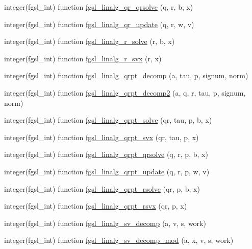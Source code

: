\begin{DoxyCompactItemize}
\item 
integer(fgsl\-\_\-int) function \hyperlink{linalg_8finc_a36ef785b86019f22ea32594b5f8060af}{fgsl\-\_\-linalg\-\_\-qr\-\_\-qrsolve} (q, r, b, x)
\item 
integer(fgsl\-\_\-int) function \hyperlink{linalg_8finc_a50523f2137f82ac54ac5f406c4792799}{fgsl\-\_\-linalg\-\_\-qr\-\_\-update} (q, r, w, v)
\item 
integer(fgsl\-\_\-int) function \hyperlink{linalg_8finc_a743b1e1ab7afa142625cd541cffc2147}{fgsl\-\_\-linalg\-\_\-r\-\_\-solve} (r, b, x)
\item 
integer(fgsl\-\_\-int) function \hyperlink{linalg_8finc_abdf5b79e92c6109a0f364962ebcae949}{fgsl\-\_\-linalg\-\_\-r\-\_\-svx} (r, x)
\item 
integer(fgsl\-\_\-int) function \hyperlink{linalg_8finc_a69ea60b78e3baf963ededde50ad72836}{fgsl\-\_\-linalg\-\_\-qrpt\-\_\-decomp} (a, tau, p, signum, norm)
\item 
integer(fgsl\-\_\-int) function \hyperlink{linalg_8finc_a3257e315b9925b49e4c4795631c90808}{fgsl\-\_\-linalg\-\_\-qrpt\-\_\-decomp2} (a, q, r, tau, p, signum, norm)
\item 
integer(fgsl\-\_\-int) function \hyperlink{linalg_8finc_aaa778ea46e4bbefce215f2341620507d}{fgsl\-\_\-linalg\-\_\-qrpt\-\_\-solve} (qr, tau, p, b, x)
\item 
integer(fgsl\-\_\-int) function \hyperlink{linalg_8finc_a79ba5beb414eb0cc23e02a005ee8aa8a}{fgsl\-\_\-linalg\-\_\-qrpt\-\_\-svx} (qr, tau, p, x)
\item 
integer(fgsl\-\_\-int) function \hyperlink{linalg_8finc_a9601978a5c17c13e34d19ddb3d5af6bc}{fgsl\-\_\-linalg\-\_\-qrpt\-\_\-qrsolve} (q, r, p, b, x)
\item 
integer(fgsl\-\_\-int) function \hyperlink{linalg_8finc_a65c186f60ce2d97d132e3df57c18ba35}{fgsl\-\_\-linalg\-\_\-qrpt\-\_\-update} (q, r, p, w, v)
\item 
integer(fgsl\-\_\-int) function \hyperlink{linalg_8finc_a632f5517167f0e2fa649ad9ab2f3d4d0}{fgsl\-\_\-linalg\-\_\-qrpt\-\_\-rsolve} (qr, p, b, x)
\item 
integer(fgsl\-\_\-int) function \hyperlink{linalg_8finc_a58f84af1a42b1026a971543a061f45f8}{fgsl\-\_\-linalg\-\_\-qrpt\-\_\-rsvx} (qr, p, x)
\item 
integer(fgsl\-\_\-int) function \hyperlink{linalg_8finc_ab47674d931fc561a5417410ec464e758}{fgsl\-\_\-linalg\-\_\-sv\-\_\-decomp} (a, v, s, work)
\item 
integer(fgsl\-\_\-int) function \hyperlink{linalg_8finc_af9767f953466e17a78a835c1fb21e588}{fgsl\-\_\-linalg\-\_\-sv\-\_\-decomp\-\_\-mod} (a, x, v, s, work)

\end{DoxyCompactItemize}

